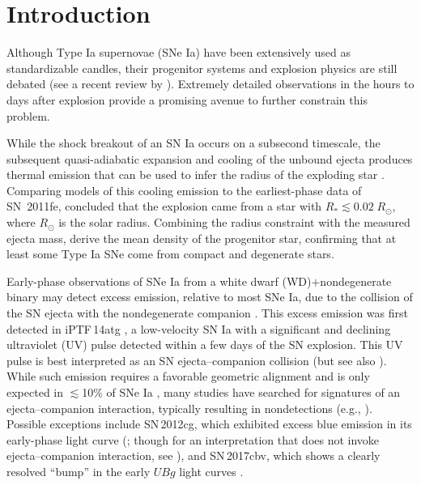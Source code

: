 \documentclass[twocolumn]{aastex61}
\newcommand{\sr}{R_\odot}
\begin{document}

\section{Introduction}
\label{sec:intro}

Although Type Ia supernovae (SNe Ia) have been extensively used as
standardizable candles, their progenitor systems and explosion physics are
still debated (see a recent review by \citealt{2014ARA&A..52..107M}).
Extremely detailed observations in the hours to days after explosion provide
a promising avenue to further constrain this problem.

While the shock breakout of an SN Ia occurs on a subsecond timescale, the
subsequent quasi-adiabatic expansion and cooling of the unbound ejecta
produces thermal emission that can be used to infer the radius of the
exploding star \citep{2010ApJ...708..598P,2011ApJ...728...63R}. Comparing
models of this cooling emission to the earliest-phase data of SN~2011fe,
\citet{2012ApJ...744L..17B} concluded that the explosion came from a star
with $R_\ast \lesssim 0.02\;\sr$, where $\sr$ is the solar radius. Combining
the radius constraint with the measured ejecta mass,
\citeauthor{2012ApJ...744L..17B} derive the mean density of the progenitor
star, confirming that at least some Type Ia SNe come from compact and
degenerate stars.

Early-phase observations of SNe Ia from a white dwarf (WD)$+$nondegenerate
binary may detect excess emission, relative to most SNe Ia, due to the
collision of the SN ejecta with the nondegenerate companion
\citep{1973ApJ...186.1007W,2010ApJ...708.1025K}. This excess emission was
first detected in iPTF\,14atg \citep{2015Natur.521..328C}, a low-velocity SN
Ia with a significant and declining ultraviolet (UV) pulse detected within a
few days of the SN explosion. This UV pulse is best interpreted as an SN
ejecta--companion collision (but see also
\citealt{2016MNRAS.459.4428K,2017MNRAS.472.2787N}). While such emission
requires a favorable geometric alignment and is only expected in
$\lesssim$10\% of SNe Ia \citep{2010ApJ...708.1025K}, many studies have
searched for signatures of an ejecta--companion interaction, typically
resulting in nondetections (e.g.,
\citealt{2010ApJ...722.1691H,2011ApJ...741...20B,2012ApJ...744...38F,
2012ApJ...744L..17B,2015Natur.521..332O,
2013ApJ...778L..15Z,2015ApJ...799..106G,2016ApJ...826..144S,
2015ApJS..221...22I}). Possible exceptions include SN\,2012cg, which
exhibited excess blue emission in its early-phase light curve
(\citealt{2016ApJ...820...92M}; though for an interpretation that does not
invoke ejecta--companion interaction, see \citealt{2016arXiv161007601S}), and
SN\,2017cbv, which shows a clearly resolved ``bump'' in the early $UBg$
light curves \citep{2017ApJ...845L..11H}.
\end{document}
